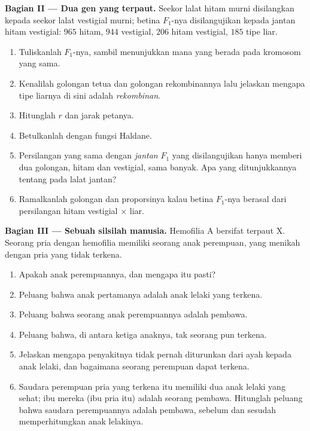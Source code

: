 \begin{problem}
\medskip
\noindent\textbf{Bagian II --- Dua gen yang terpaut.}
Seekor lalat hitam murni disilangkan kepada seekor lalat vestigial
murni; betina $F_1$-nya disilangujikan kepada jantan hitam vestigial:
$965$ hitam, $944$ vestigial, $206$ hitam vestigial, $185$ tipe liar.
\begin{enumerate}[resume]
  \item Tuliskanlah  $F_1$-nya, sambil menunjukkan  mana
        yang berada pada kromosom yang sama.
  \item Kenalilah golongan tetua dan golongan rekombinannya lalu
        jelaskan mengapa tipe liarnya di sini adalah \emph{rekombinan}.
  \item Hitunglah $r$ dan jarak petanya.
  \item Betulkanlah dengan fungsi Haldane.
  \item Persilangan yang sama dengan \emph{jantan} $F_1$ yang
        disilangujikan hanya memberi dua golongan, hitam dan
        vestigial, sama banyak. Apa yang ditunjukkannya tentang 
        pada lalat jantan?
  \item Ramalkanlah golongan dan proporsinya kalau betina $F_1$-nya
        berasal dari persilangan hitam vestigial $\times$ liar.
\end{enumerate}

\medskip
\noindent\textbf{Bagian III --- Sebuah silsilah manusia.}
Hemofilia A bersifat  terpaut X. Seorang pria dengan hemofilia
memiliki seorang anak perempuan, yang menikah dengan pria yang tidak terkena.
\begin{enumerate}[resume]
  \item Apakah  anak perempuannya, dan mengapa  itu pasti?
  \item Peluang bahwa anak pertamanya adalah anak lelaki yang terkena.
  \item Peluang bahwa seorang anak perempuannya adalah pembawa.
  \item Peluang bahwa, di antara ketiga anaknya, tak seorang pun
        terkena.
  \item Jelaskan mengapa penyakitnya tidak pernah diturunkan dari ayah
        kepada anak lelaki, dan bagaimana seorang perempuan dapat terkena.
  \item Saudara perempuan pria yang terkena itu memiliki dua anak
        lelaki yang sehat; ibu mereka (ibu pria itu) adalah seorang
        pembawa. Hitunglah peluang bahwa saudara perempuannya adalah
        pembawa, sebelum dan sesudah memperhitungkan anak lelakinya.
\end{enumerate}


\end{problem}
